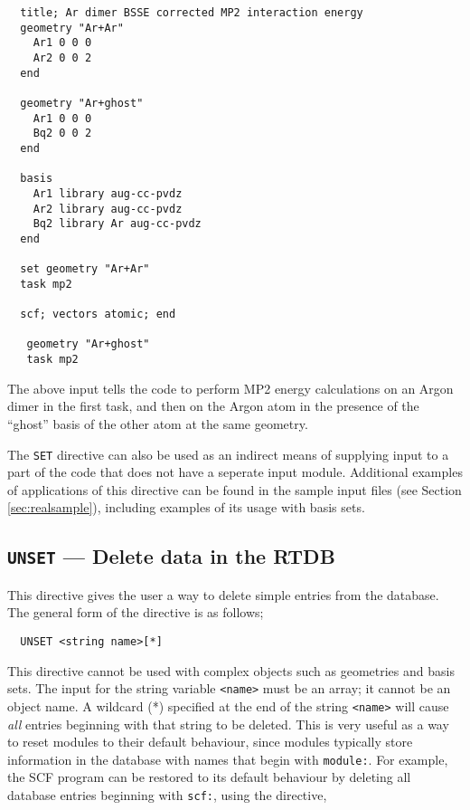 \begin{verbatim}
  title; Ar dimer BSSE corrected MP2 interaction energy
  geometry "Ar+Ar"
    Ar1 0 0 0
    Ar2 0 0 2
  end

  geometry "Ar+ghost"
    Ar1 0 0 0
    Bq2 0 0 2
  end

  basis
    Ar1 library aug-cc-pvdz
    Ar2 library aug-cc-pvdz
    Bq2 library Ar aug-cc-pvdz
  end

  set geometry "Ar+Ar"
  task mp2 

  scf; vectors atomic; end

   geometry "Ar+ghost"
   task mp2 
\end{verbatim}

The above input tells the code to perform MP2 energy calculations 
on an Argon dimer in the first task, and then
on the Argon atom in the presence of the ``ghost'' basis of the other
atom at the same geometry.

The \verb+SET+ directive can also be used as an indirect means of
supplying input to a part of the code that does not have a seperate input module.  
Additional examples of applications of this
directive can be found in the sample input files (see Section 
\ref{sec:realsample}), including examples of its usage with basis sets.

\subsection{{\tt UNSET} --- Delete data in the RTDB}
\label{sec:unset}

This directive gives the user a way to delete simple entries from the
database.  The general form of the directive is as follows;

\begin{verbatim}
  UNSET <string name>[*]
\end{verbatim}

This directive cannot be used with complex objects such as geometries
and basis sets.  The input for the string variable \verb+<name>+ must 
be an array; it cannot be an
object name.  A wildcard (*) specified at the end of the string
\verb+<name>+ will cause {\em all} entries beginning with that string to
be deleted.  This is very useful as a way to reset modules to their
default behaviour, since modules typically store information in the
database with names that begin with \verb+module:+.
For example, the SCF program can be restored to its default behaviour by
deleting all database entries beginning with \verb+scf:+, using the directive,

